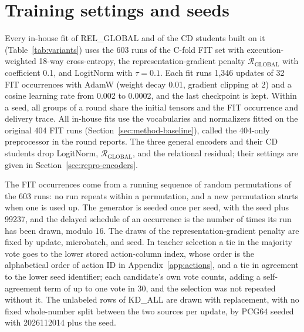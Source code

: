 \section{Training settings and seeds}
\label{sec:repro-training}

Every in-house fit of REL\_GLOBAL and of the CD students built on it
(Table~\ref{tab:variants}) uses the
603 runs of the C-fold FIT set with execution-weighted 18-way
cross-entropy, the representation-gradient penalty $\mathcal{R}_{\mathrm{GLOBAL}}$
with coefficient 0.1, and LogitNorm with $\tau=0.1$. Each fit runs
1,346 updates of 32 FIT occurrences with AdamW (weight decay 0.01,
gradient clipping at 2) and a cosine learning rate from 0.002 to
0.0002, and the last checkpoint is kept. Within a seed, all groups of a
round share the initial tensors and the FIT occurrence and delivery
trace. All in-house fits use the vocabularies and normalizers fitted on
the original 404 FIT runs (Section~\ref{sec:method-baseline}), called
the 404-only preprocessor in the round reports. The three general encoders and
their CD students drop LogitNorm, $\mathcal{R}_{\mathrm{GLOBAL}}$, and
the relational residual; their settings are given in
Section~\ref{sec:repro-encoders}.

The FIT occurrences come from a running sequence of random
permutations of the 603 runs: no run repeats within a permutation, and
a new permutation starts when one is used up. The generator is seeded
once per seed, with the seed plus 99237, and the delayed schedule of an
occurrence is the number of times its run has been drawn, modulo 16.
The draws of the representation-gradient penalty are fixed by update,
microbatch, and seed. In teacher selection a tie in the majority vote
goes to the lower stored action-column index, whose order is the
alphabetical order of action ID in Appendix~\ref{app:actions}, and a
tie in agreement to the lower seed identifier; each candidate's own
vote counts, adding a self-agreement term of up to one vote in 30, and
the selection was not repeated without it. The unlabeled rows of
KD\_ALL are drawn with replacement, with no fixed whole-number split
between the two sources per update, by PCG64 seeded with 2026112014
plus the seed.

